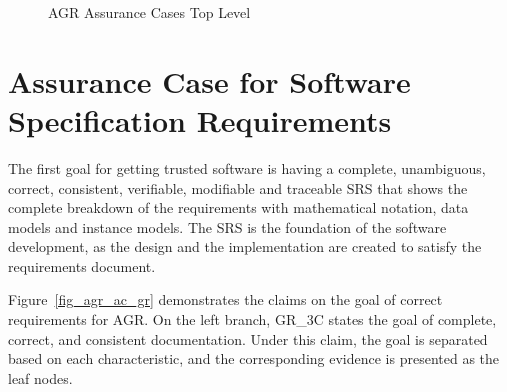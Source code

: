 \begin{figure}[hp]
    \centering
    \caption[AGR Assurance Cases Top Level]{AGR Assurance Cases Top Level}
    \label{fig_agr_ac_top}
\end{figure}


\section{Assurance Case for Software Specification Requirements}

The first goal for getting trusted software is having a complete, unambiguous, correct, consistent, verifiable, modifiable and traceable SRS that shows the complete breakdown of the requirements with mathematical notation, data models and instance models. The SRS is the foundation of the software development, as the design and the implementation are created to satisfy the requirements document.

Figure~\ref{fig_agr_ac_gr} demonstrates the claims on the goal of correct requirements for AGR. On the left branch, GR\_3C states the goal of complete, correct, and consistent documentation. Under this claim, the goal is separated based on each characteristic, and the corresponding evidence is presented as the leaf nodes.

